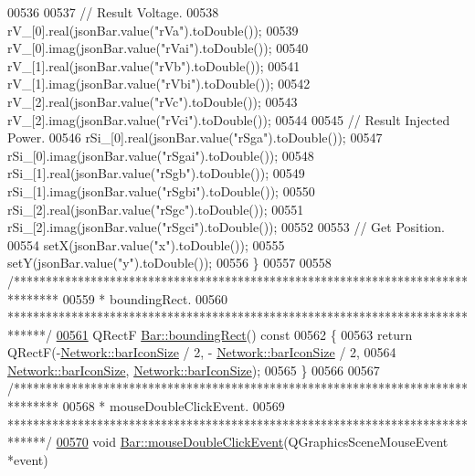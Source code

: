 \begin{DoxyCode}
00536 
00537   \textcolor{comment}{// Result Voltage.}
00538   rV\_[0].real(jsonBar.value(\textcolor{stringliteral}{"rVa"}).toDouble());
00539   rV\_[0].imag(jsonBar.value(\textcolor{stringliteral}{"rVai"}).toDouble());
00540   rV\_[1].real(jsonBar.value(\textcolor{stringliteral}{"rVb"}).toDouble());
00541   rV\_[1].imag(jsonBar.value(\textcolor{stringliteral}{"rVbi"}).toDouble());
00542   rV\_[2].real(jsonBar.value(\textcolor{stringliteral}{"rVc"}).toDouble());
00543   rV\_[2].imag(jsonBar.value(\textcolor{stringliteral}{"rVci"}).toDouble());
00544 
00545   \textcolor{comment}{// Result Injected Power.}
00546   rSi\_[0].real(jsonBar.value(\textcolor{stringliteral}{"rSga"}).toDouble());
00547   rSi\_[0].imag(jsonBar.value(\textcolor{stringliteral}{"rSgai"}).toDouble());
00548   rSi\_[1].real(jsonBar.value(\textcolor{stringliteral}{"rSgb"}).toDouble());
00549   rSi\_[1].imag(jsonBar.value(\textcolor{stringliteral}{"rSgbi"}).toDouble());
00550   rSi\_[2].real(jsonBar.value(\textcolor{stringliteral}{"rSgc"}).toDouble());
00551   rSi\_[2].imag(jsonBar.value(\textcolor{stringliteral}{"rSgci"}).toDouble());
00552 
00553   \textcolor{comment}{// Get Position.}
00554   setX(jsonBar.value(\textcolor{stringliteral}{"x"}).toDouble());
00555   setY(jsonBar.value(\textcolor{stringliteral}{"y"}).toDouble());
00556 \}
00557 
00558 \textcolor{comment}{/*******************************************************************************}
00559 \textcolor{comment}{ * boundingRect.}
00560 \textcolor{comment}{ ******************************************************************************/}
\hypertarget{bar_8cpp_source_l00561}{}\hyperlink{group___models_ga8279d8109019cc7e139e2023690496be}{00561} QRectF \hyperlink{group___models_ga8279d8109019cc7e139e2023690496be}{Bar::boundingRect}()\textcolor{keyword}{ const}
00562 \textcolor{keyword}{}\{
00563   \textcolor{keywordflow}{return} QRectF(-\hyperlink{group___graphics_gaa334bbc93b3fde219840e95e23198b53}{Network::barIconSize} / 2, -
      \hyperlink{group___graphics_gaa334bbc93b3fde219840e95e23198b53}{Network::barIconSize} / 2,
00564                 \hyperlink{group___graphics_gaa334bbc93b3fde219840e95e23198b53}{Network::barIconSize}, \hyperlink{group___graphics_gaa334bbc93b3fde219840e95e23198b53}{Network::barIconSize});
00565 \}
00566 
00567 \textcolor{comment}{/*******************************************************************************}
00568 \textcolor{comment}{ * mouseDoubleClickEvent.}
00569 \textcolor{comment}{ ******************************************************************************/}
\hypertarget{bar_8cpp_source_l00570}{}\hyperlink{group___models_ga1945e7b4401fa9ad7475274d9fb12a72}{00570} \textcolor{keywordtype}{void} \hyperlink{group___models_ga1945e7b4401fa9ad7475274d9fb12a72}{Bar::mouseDoubleClickEvent}(QGraphicsSceneMouseEvent *event)

\end{DoxyCode}
